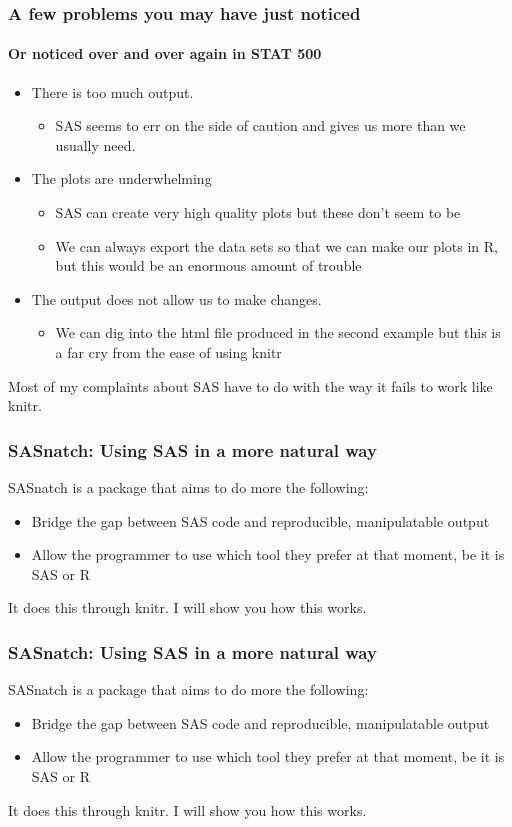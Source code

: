 \documentclass[xcolor=dvipsnames,gray,mathserif]{beamer}
\begin{document}
\begin{frame}
   \frametitle{A few problems you may have just noticed}
   \framesubtitle{Or noticed over and over again in STAT 500}
   \begin{itemize}
      \item There is too much output.
      \begin{itemize}
         \item SAS seems to err on the side of caution and gives us more than we usually need.
      \end{itemize}
      \item The plots are underwhelming
      \begin{itemize}
         \item SAS can create very high quality plots but these don't seem to be
         \item We can always export the data sets so that we can make our plots in R, but this would be an enormous amount of trouble
      \end{itemize}
      \pause
      \item The output does not allow us to make changes.
      \begin{itemize}
         \item We can dig into the html file produced in the second example
            but this is a far cry from the ease of using knitr
      \end{itemize}
   \end{itemize}
   Most of my complaints about SAS have to do with the way it fails to work like knitr.
\end{frame}

\begin{frame}
   \frametitle{SASnatch: Using SAS in a more natural way}

   SASnatch is a package that aims to do more the following:
   \begin{itemize}
      \item Bridge the gap between SAS code and reproducible, manipulatable output
      \item Allow the programmer to use which tool they prefer at that moment, be
         it is SAS or R
   \end{itemize}

   It does this through knitr. I will show you how this works.
\end{frame}

\begin{frame}
   \frametitle{SASnatch: Using SAS in a more natural way}

   SASnatch is a package that aims to do more the following:
   \begin{itemize}
      \item Bridge the gap between SAS code and reproducible, manipulatable output
      \item Allow the programmer to use which tool they prefer at that moment, be
         it is SAS or R
   \end{itemize}

   It does this through knitr. I will show you how this works.
\end{frame}
\end{document}
